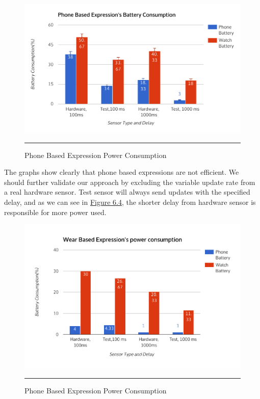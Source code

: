  \begin{figure}[htbp]
  \centering
    \includegraphics[scale=0.8]{Figures/phone_expr_consumption.pdf}
    \rule{35em}{0.5pt}
  \caption[Expression Power Consumption]{Phone Based Expression Power Consumption}
  \label{fig:phone_expr_consumption}
\end{figure}

The graphs show clearly that phone based expressions are not efficient.  We should further validate our approach by excluding the variable update rate from a real hardware sensor.
Test sensor will always send updates with the specified delay, and as we can see in \hyperref[fig:phone_expr_consumption]{Figure 6.4}, the shorter delay from hardware sensor is responsible
for more power used.

 \begin{figure}[htbp]
  \centering
    \includegraphics[scale=0.8]{Figures/wear_expr_consumption.pdf}
    \rule{35em}{0.5pt}
  \caption[Expression Power Consumption]{Phone Based Expression Power Consumption}
  \label{fig:wear_expr_consumption}
\end{figure}

